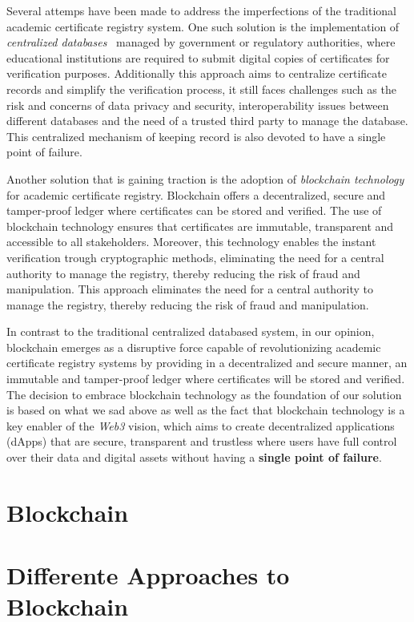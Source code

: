 Several attemps have been made to address the imperfections of the traditional academic certificate registry system.
One such solution is the implementation of \textit{centralized databases}~\cite{OLSON200971} managed by government or regulatory authorities, where educational institutions are required to
submit digital copies of certificates for verification purposes. Additionally this approach aims to centralize certificate records and simplify the verification process, it still faces challenges
such as the risk and concerns of data privacy and security, interoperability issues between different databases and the need of a trusted third party to manage the database.
This centralized mechanism of keeping record is also devoted to have a single point of failure.

Another solution that is gaining traction is the adoption of \textit{blockchain technology} for academic certificate registry. Blockchain offers a decentralized, secure and tamper-proof ledger where certificates can be stored and verified.
The use of blockchain technology ensures that certificates are immutable, transparent and accessible to all stakeholders. Moreover, this technology enables the instant verification trough cryptographic methods,
eliminating the need for a central authority to manage the registry, thereby reducing the risk of fraud and manipulation.
This approach eliminates the need for a central authority to manage the registry, thereby reducing the risk of fraud and manipulation.

In contrast to the traditional centralized databased system, in our opinion, blockchain emerges as a disruptive force capable of revolutionizing academic certificate registry systems
by providing in a decentralized and secure manner, an immutable and tamper-proof ledger where certificates will be stored and verified.
The decision to embrace blockchain technology as the foundation of our solution is based on what we sad above as well as the fact that blockchain technology is a key enabler of the \textit{Web3} vision,
which aims to create decentralized applications (dApps) that are secure, transparent and trustless where users have full control over their data and digital assets without having a \textbf{single point of failure}.

\pagebreak %

\section{Blockchain}\label{sec:blockchain}
\paragraph{}

\section{Differente Approaches to Blockchain}\label{sec:different-approaches-to-blockchain}
\paragraph{}




